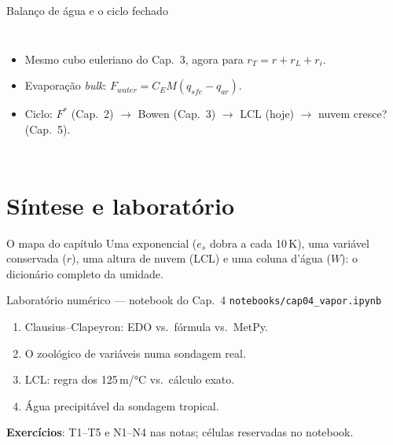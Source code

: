 \documentclass[aspectratio=169,11pt]{beamer}
\begin{document}
\begin{frame}{Balanço de água e o ciclo fechado}
  \begin{columns}
    \vspace{0.4em}
    \begin{itemize}
      \item Mesmo cubo euleriano do Cap.~3, agora para $r_T = r + r_L +
            r_i$.
      \item Evaporação \emph{bulk}: $F_{water} = C_E M
            (q_{sfc}-q_{ar})$.
      \item Ciclo: $F^*$ (Cap.~2) $\to$ Bowen (Cap.~3) $\to$ LCL (hoje)
            $\to$ nuvem cresce? (Cap.~5).
    \end{itemize}
  \end{columns}
\end{frame}

\section{Síntese e laboratório}

\begin{frame}{O mapa do capítulo}
  \vspace{0.6em}
  Uma exponencial ($e_s$ dobra a cada 10\,K), uma variável conservada
  ($r$), uma altura de nuvem (LCL) e uma coluna d'água ($W$): o
  dicionário completo da umidade.
\end{frame}

\begin{frame}{Laboratório numérico --- notebook do Cap.~4}
  \texttt{notebooks/cap04\_vapor.ipynb}
  \begin{enumerate}
    \item Clausius--Clapeyron: EDO vs.\ fórmula vs.\ MetPy.
    \item O zoológico de variáveis numa sondagem real.
    \item LCL: regra dos 125\,m/°C vs.\ cálculo exato.
    \item Água precipitável da sondagem tropical.
  \end{enumerate}
  \vspace{0.4em}
  \textbf{Exercícios}: T1--T5 e N1--N4 nas notas; células reservadas no
  notebook.
  \vfill
  \atribuicao
\end{frame}
\end{document}
